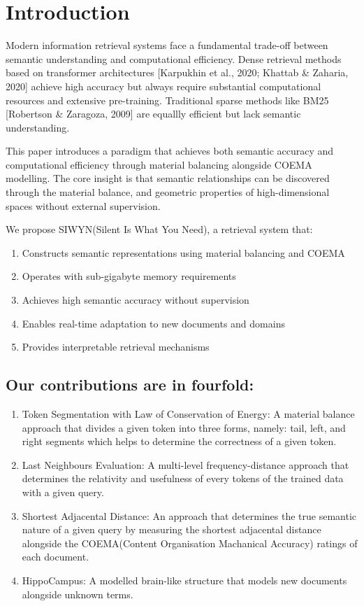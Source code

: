 \documentclass[scifiniti,article,submit,moreauthors,twocolumn,twoside]{Definitions/scifiniti_jams}
\begin{document}

\section{Introduction}
Modern information retrieval systems face a fundamental trade-off between semantic understanding and computational efficiency. Dense retrieval methods based on transformer architectures [Karpukhin et al., 2020; Khattab \& Zaharia, 2020] achieve high accuracy but always require substantial computational resources and extensive pre-training. Traditional sparse methods like BM25 [Robertson \& Zaragoza, 2009] are equallly efficient but lack semantic understanding.

This paper introduces a paradigm that achieves both semantic accuracy and computational efficiency through material balancing alongside COEMA modelling. The core insight is that semantic relationships can be discovered through the material balance, and geometric properties of high-dimensional spaces without external supervision.

{We propose SIWYN(Silent Is What You Need), a retrieval system that:}
\begin{enumerate}
\item Constructs semantic representations using material balancing and COEMA
\item Operates with sub-gigabyte memory requirements 
\item Achieves high semantic accuracy without supervision
\item Enables real-time adaptation to new documents and domains
\item Provides interpretable retrieval mechanisms
\end{enumerate}


\subsection{Our contributions are in fourfold:}

\begin{enumerate}
\item	Token Segmentation with  Law of Conservation of Energy: A material balance approach that divides a given token into three forms, namely: tail, left, and right segments which helps to determine the correctness of a given token.

\item	Last Neighbours Evaluation: A multi-level frequency-distance approach that determines the relativity and usefulness of every tokens of the trained data with a given query.

\item	Shortest Adjacental Distance: An approach that determines the true semantic nature of a given query by measuring the shortest adjacental distance alongside the COEMA(Content Organisation Machanical Accuracy) ratings of each document.

\item HippoCampus: A modelled brain-like structure that models new documents alongside unknown terms.
\end{enumerate}
\end{document}
